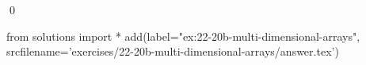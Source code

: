 
\begin{ex} 
  \label{ex:22-20b-multi-dimensional-arrays}
  
  \qed
\end{ex} 
\begin{python0}
from solutions import *
add(label="ex:22-20b-multi-dimensional-arrays",
    srcfilename='exercises/22-20b-multi-dimensional-arrays/answer.tex') 
\end{python0}
